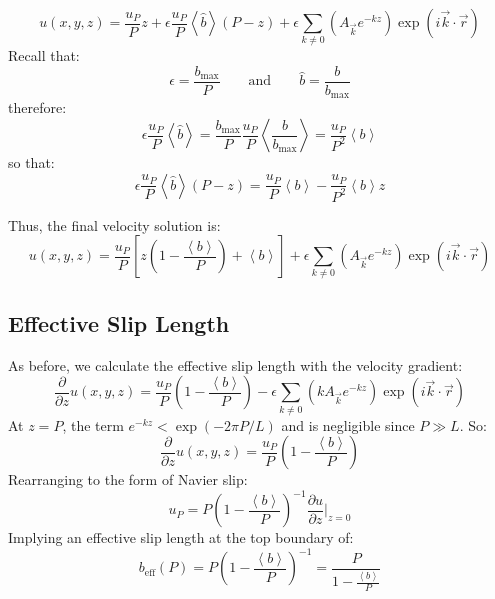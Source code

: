 \documentclass[12pt, a4paper, twoside, openright]{book}
\newcommand{\beff}{\ensuremath{b_{\mathrm{eff}}}}
\newcommand{\bmax}{\ensuremath{b_{\mathrm{max}}}}
\begin{document}
\begin{equation}
u(x,y,z) = \frac{u_P}{P} z
 + \epsilon \frac{u_P}{P} \left< \hat{b} \right> (P - z)
 +  \epsilon \sum_{k \neq 0} 
\left(  A_{\vec{k}} e^{-kz} \right)
\exp(i \vec{k}\cdot \vec{r})
\end{equation}
Recall that:
\begin{equation}
\epsilon = \frac{\bmax}{P} \qquad \text{and} \qquad
\hat{b} = \frac{b}{\bmax}
\end{equation}
therefore:
\begin{equation}
\epsilon \frac{u_P}{P} \left< \hat{b} \right> 
= \frac{\bmax}{P} \frac{u_P }{P} \left< \frac{b}{\bmax} \right> 
= \frac{u_P}{P^2} \left< b \right>
\end{equation}
so that:
\begin{equation}
\epsilon \frac{u_P}{P} \left< \hat{b} \right> (P - z)
= \frac{u_P}{P} \left< b \right> - \frac{u_P}{P^2} \left< b \right> z
\end{equation}


Thus, the final velocity solution is:
\begin{equation}
u(x,y,z) = \frac{u_P}{P} 
\left[ z \left( 1 - \frac{\left< b \right>}{P} \right) + \left< b \right> \right]
 +  \epsilon \sum_{k \neq 0} 
\left(  A_{\vec{k}} e^{-kz} \right)
\exp(i \vec{k}\cdot \vec{r})
\end{equation}



\subsection{Effective Slip Length}

As before, we calculate the effective slip length with the velocity gradient:
\begin{equation}
\frac{\partial}{\partial z} u(x,y,z) = \frac{u_P}{P} 
\left( 1 - \frac{\left< b \right>}{P} \right)
- \epsilon \sum_{k \neq 0} 
\left( k A_{\vec{k}} e^{-kz} \right)
\exp(i \vec{k}\cdot \vec{r})
\end{equation}
At $z = P$, the term $e^{-kz} < \exp ( - 2 \pi P/L )$ and is negligible since $P \gg L$. So:
\begin{equation}
\frac{\partial}{\partial z} u(x,y,z) = \frac{u_P}{P} 
\left( 1 - \frac{\left< b \right>}{P} \right)
\end{equation}
Rearranging to the form of Navier slip:
\begin{equation}
u_P = P \left( 1 - \frac{\left< b \right>}{P} \right)^{-1}
 \frac{\partial u}{\partial z} \rvert_{z=0}
\end{equation}
Implying an effective slip length at the top boundary of:
\begin{equation}
\beff(P) = P \left( 1 - \frac{\left< b \right>}{P} \right)^{-1} 
= \frac{P}{1 - \frac{\left< b \right>}{P}}
\end{equation}
\end{document}
